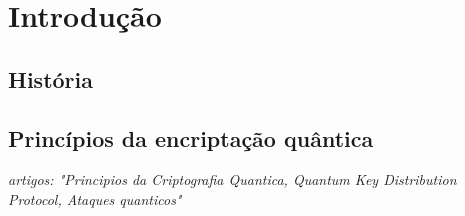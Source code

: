 \chapter{Introdução}

\section{História}

\section{Princípios da encriptação quântica}

\textit{artigos: "Principios da Criptografia Quantica, Quantum Key Distribution Protocol, Ataques quanticos"}

